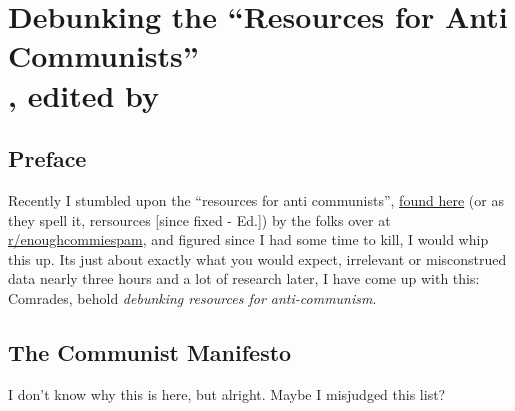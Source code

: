 \section[Debunking the ``Resources for Anti Communists'']{Debunking the ``Resources for Anti Communists''\\\small{, edited by }}
\subsection*{Preface}
Recently I stumbled upon the ``resources for anti communists'', \href{https://www.reddit.com/r/EnoughCommieSpam/wiki/anti_commie_resources}{found here} (or as they spell it, rersources [since fixed - Ed.]) by the folks over at \href{https://np.reddit.com/r/enoughcommiespam}{r/enoughcommiespam}, and figured since I had some time to kill, I would whip this up.
Its just about exactly what you would expect, irrelevant or misconstrued data nearly three hours and a lot of research later, I have come up with this: Comrades, behold \emph{debunking resources for anti-communism}.

\subsection{The Communist Manifesto}
I don't know why this is here, but alright. Maybe I misjudged this list?

